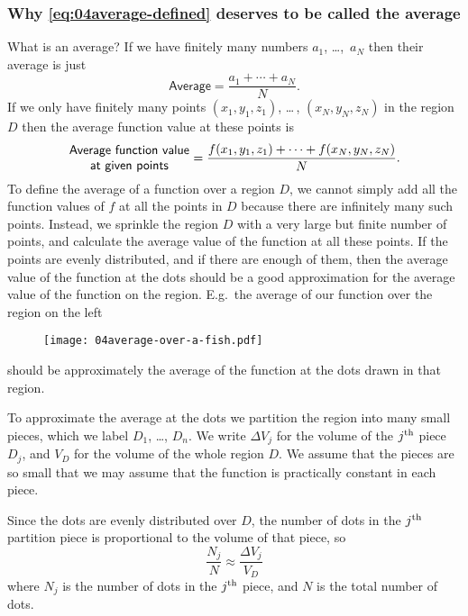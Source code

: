 \subsubsection*{Why \eqref{eq:04average-defined} deserves to be called the average}
What is an average?
If we have finitely many numbers $a_1$, \ldots,\, $a_N$ then their average is
just
\[
\textsf{Average} = \frac{a_1+\cdots+a_N}{N}.
\]
If we only have finitely many points $(x_1,y_1,z_1)$, \ldots \,, $(x_N,
y_N, z_N)$ in the region $D$ then the average function value at these
points is
\[
 \parbox{96pt}{\sffamily\centering Average function value\\ at given points}=
 \frac{f(x_1,y_1,z_1) + \cdots + f(x_N, y_N, z_N)}{N}. 
\]
To define the average of a function over a region $D$, we cannot simply
add all the function values of $f$ at all the points in $D$ because
there are infinitely many such points.  Instead, we sprinkle the region
$D$ with a very large but finite number of points, and calculate the
average value of the function at all these points.  If the points are
evenly distributed, and if there are enough of them, then the average
value of the function at the dots should be a good approximation for the
average value of the function on the region.  E.g.~the average of our
function over the region on the left
\begin{figure}[h]
\texttt{[image: 04average-over-a-fish.pdf]}
\end{figure}
should be approximately the average of the function at the dots drawn in that region.

To approximate the average at the dots we partition the region into many
small pieces, which we label $D_1$, \dots, $D_n$.  We write $\Delta V_j$
for the volume of the $j^{\rm th}$ piece $D_j$, and $V_D$ for the volume
of the whole region $D$.  We assume that the pieces are so small that we
may assume that the function is practically constant in each piece.

Since the dots are evenly distributed over $D$, the number of dots in
the $j^{\rm th}$ partition piece is proportional to the volume of that
piece, so
\begin{equation}
 \frac{N_j}{N}
  \approx \frac{\Delta V_j}{V_D} 
\label{eq:number-of-dots-in-Dj}
\end{equation}
where $N_j$ is the number of dots in the $j^{\rm th}$ piece, and $N$ is
the total number of dots.

